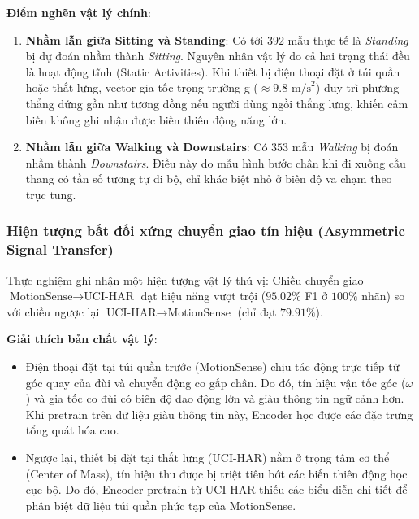\textbf{Điểm nghẽn vật lý chính}:
\begin{enumerate}
    \item \textbf{Nhầm lẫn giữa Sitting và Standing}: Có tới $392$ mẫu thực tế là \textit{Standing} bị dự đoán nhầm thành \textit{Sitting}. Nguyên nhân vật lý do cả hai trạng thái đều là hoạt động tĩnh (Static Activities). Khi thiết bị điện thoại đặt ở túi quần hoặc thắt lưng, vector gia tốc trọng trường g ($\approx 9.8\text{ m/s}^2$) duy trì phương thẳng đứng gần như tương đồng nếu người dùng ngồi thẳng lưng, khiến cảm biến không ghi nhận được biến thiên động năng lớn.
    \item \textbf{Nhầm lẫn giữa Walking và Downstairs}: Có $353$ mẫu \textit{Walking} bị đoán nhầm thành \textit{Downstairs}. Điều này do mẫu hình bước chân khi đi xuống cầu thang có tần số tương tự đi bộ, chỉ khác biệt nhỏ ở biên độ va chạm theo trục tung.
\end{enumerate}

\subsubsection{Hiện tượng bất đối xứng chuyển giao tín hiệu (Asymmetric Signal Transfer)}
Thực nghiệm ghi nhận một hiện tượng vật lý thú vị: Chiều chuyển giao $\text{MotionSense} \rightarrow \text{UCI-HAR}$ đạt hiệu năng vượt trội ($95.02\%$ F1 ở $100\%$ nhãn) so với chiều ngược lại $\text{UCI-HAR} \rightarrow \text{MotionSense}$ (chỉ đạt $79.91\%$).

\textbf{Giải thích bản chất vật lý}:
\begin{itemize}
    \item Điện thoại đặt tại túi quần trước (MotionSense) chịu tác động trực tiếp từ góc quay của đùi và chuyển động co gấp chân. Do đó, tín hiệu vận tốc góc ($\omega$) và gia tốc co đùi có biên độ dao động lớn và giàu thông tin ngữ cảnh hơn. Khi pretrain trên dữ liệu giàu thông tin này, Encoder học được các đặc trưng tổng quát hóa cao.
    \item Ngược lại, thiết bị đặt tại thắt lưng (UCI-HAR) nằm ở trọng tâm cơ thể (Center of Mass), tín hiệu thu được bị triệt tiêu bớt các biến thiên động học cục bộ. Do đó, Encoder pretrain từ UCI-HAR thiếu các biểu diễn chi tiết để phân biệt dữ liệu túi quần phức tạp của MotionSense.
\end{itemize}

